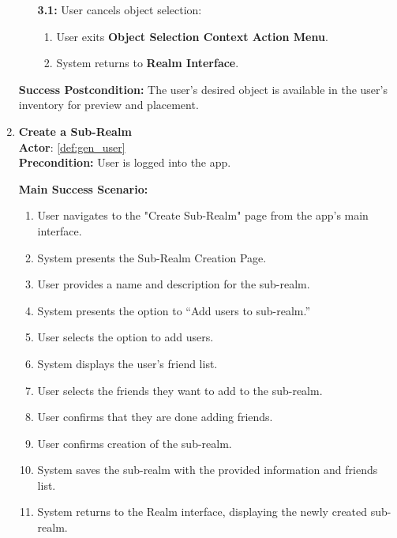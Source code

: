 \documentclass{article}
\begin{document}
\begin{enumerate}[label=\textbf{UC\arabic*}]
\begin{itemize}
              \item[{\bf 3.1:}] User cancels object selection:
                  \begin{enumerate}[label=\textbf{\arabic*.}]
                      \item User exits \textbf{Object Selection Context Action Menu}.
                      \item System returns to \textbf{Realm Interface}.
                  \end{enumerate}
          \end{itemize}

          \textbf{Success Postcondition:} The user’s desired object is available in the user’s inventory for preview and placement.


    \item \label{uc:17} \textbf{Create a Sub-Realm} \\
          \textbf{Actor}: \ref{def:gen_user} \\
          \textbf{Precondition:} User is logged into the app.

          \textbf{Main Success Scenario:}
          \begin{enumerate}[label=\textbf{\arabic*.}]
              \item User navigates to the "Create Sub-Realm" page from the app’s main interface.
              \item System presents the Sub-Realm Creation Page.
              \item User provides a name and description for the sub-realm.
              \item System presents the option to “Add users to sub-realm.”
              \item User selects the option to add users.
              \item System displays the user’s friend list.
              \item User selects the friends they want to add to the sub-realm.
              \item User confirms that they are done adding friends.
              \item User confirms creation of the sub-realm.
              \item System saves the sub-realm with the provided information and friends list.
              \item System returns to the Realm interface, displaying the newly created sub-realm.
          \end{enumerate}


\end{enumerate}
\end{document}
